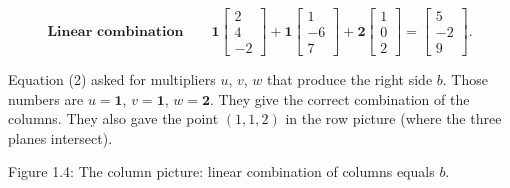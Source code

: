 \[\textbf{Linear combination}\qquad\textbf{1}\begin{bmatrix}2\\ 4\\ -2\end{bmatrix}+\textbf{1}\begin{bmatrix}1\\ -6\\ 7\end{bmatrix}+\textbf{2}\begin{bmatrix}1\\ 0\\ 2\end{bmatrix}=\begin{bmatrix}5\\ -2\\ 9\end{bmatrix}.\]

Equation (2) asked for multipliers \(u\), \(v\), \(w\) that produce the right side \(b\). Those numbers are \(u=\textbf{1}\), \(v=\textbf{1}\), \(w=\textbf{2}\). They give the correct combination of the columns. They also gave the point \((1,1,2)\) in the row picture (where the three planes intersect).

Figure 1.4: The column picture: linear combination of columns equals \(b\).

 